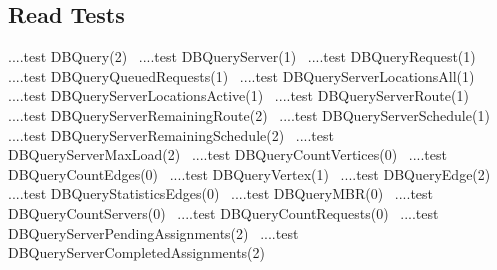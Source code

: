 \documentclass{article}
\begin{document}
\subsection{Read Tests}
\label{sec:read-tests}
\nwenddocs{}\endmoddef{}
\LA{}....test \code{}DBQuery\edoc{}(2)~{\nwtagstyle{}}\RA{}
\LA{}....test \code{}DBQueryServer\edoc{}(1)~{\nwtagstyle{}}\RA{}
\LA{}....test \code{}DBQueryRequest\edoc{}(1)~{\nwtagstyle{}}\RA{}
\LA{}....test \code{}DBQueryQueuedRequests\edoc{}(1)~{\nwtagstyle{}}\RA{}
\LA{}....test \code{}DBQueryServerLocationsAll\edoc{}(1)~{\nwtagstyle{}}\RA{}
\LA{}....test \code{}DBQueryServerLocationsActive\edoc{}(1)~{\nwtagstyle{}}\RA{}
\LA{}....test \code{}DBQueryServerRoute\edoc{}(1)~{\nwtagstyle{}}\RA{}
\LA{}....test \code{}DBQueryServerRemainingRoute\edoc{}(2)~{\nwtagstyle{}}\RA{}
\LA{}....test \code{}DBQueryServerSchedule\edoc{}(1)~{\nwtagstyle{}}\RA{}
\LA{}....test \code{}DBQueryServerRemainingSchedule\edoc{}(2)~{\nwtagstyle{}}\RA{}
\LA{}....test \code{}DBQueryServerMaxLoad\edoc{}(2)~{\nwtagstyle{}}\RA{}
\LA{}....test \code{}DBQueryCountVertices\edoc{}(0)~{\nwtagstyle{}}\RA{}
\LA{}....test \code{}DBQueryCountEdges\edoc{}(0)~{\nwtagstyle{}}\RA{}
\LA{}....test \code{}DBQueryVertex\edoc{}(1)~{\nwtagstyle{}}\RA{}
\LA{}....test \code{}DBQueryEdge\edoc{}(2)~{\nwtagstyle{}}\RA{}
\LA{}....test \code{}DBQueryStatisticsEdges\edoc{}(0)~{\nwtagstyle{}}\RA{}
\LA{}....test \code{}DBQueryMBR\edoc{}(0)~{\nwtagstyle{}}\RA{}
\LA{}....test \code{}DBQueryCountServers\edoc{}(0)~{\nwtagstyle{}}\RA{}
\LA{}....test \code{}DBQueryCountRequests\edoc{}(0)~{\nwtagstyle{}}\RA{}
\LA{}....test \code{}DBQueryServerPendingAssignments\edoc{}(2)~{\nwtagstyle{}}\RA{}
\LA{}....test \code{}DBQueryServerCompletedAssignments\edoc{}(2)~{\nwtagstyle{}}\RA{}
\end{document}
